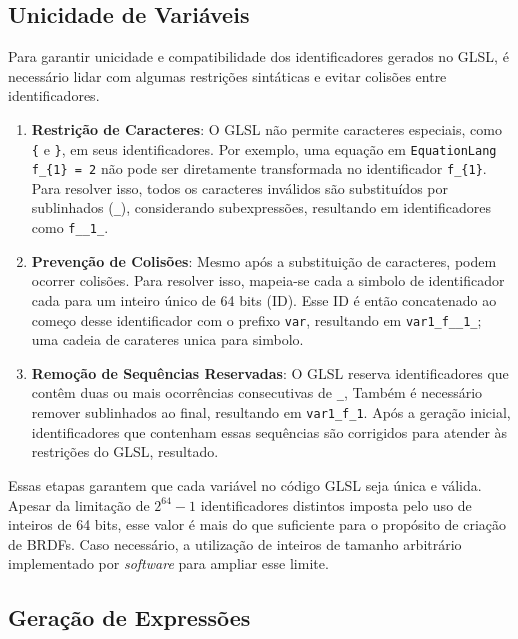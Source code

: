 \subsection{Unicidade de Variáveis} \label{sec-unicidade}

Para garantir unicidade e compatibilidade dos identificadores gerados no GLSL, é necessário lidar com algumas restrições sintáticas e evitar colisões entre identificadores.

\begin{enumerate}
    \item \textbf{Restrição de Caracteres}: O GLSL não permite caracteres especiais, como \verb"{" e \verb"}", em seus identificadores. Por exemplo, uma equação em \texttt{EquationLang} \verb "f_{1} = 2" não pode ser diretamente transformada no identificador \verb`f_{1}`. Para resolver isso, todos os caracteres inválidos são substituídos por sublinhados (\verb`_`), considerando subexpressões, resultando em identificadores como \verb`f__1_`.

    \item \textbf{Prevenção de Colisões}: Mesmo após a substituição de caracteres, podem ocorrer colisões. Para resolver isso, mapeia-se cada a simbolo de identificador cada para um inteiro único de 64 bits (ID). Esse ID é então concatenado ao começo desse identificador com o prefixo \verb`var`, resultando em \verb`var1_f__1_`; uma cadeia de carateres unica para simbolo.

    \item \textbf{Remoção de Sequências Reservadas}: O GLSL reserva identificadores que contêm duas ou mais ocorrências consecutivas de \verb`_`, Também é necessário remover sublinhados ao final, resultando em \verb`var1_f_1`. Após a geração inicial, identificadores que contenham essas sequências são corrigidos para atender às restrições do GLSL, resultado.
\end{enumerate}


Essas etapas garantem que cada variável no código GLSL seja única e válida. Apesar da limitação de $2^{64} - 1$ identificadores distintos imposta pelo uso de inteiros de 64 bits, esse valor é mais do que suficiente para o propósito de criação de BRDFs. Caso necessário, a utilização de inteiros de tamanho arbitrário implementado por \textit{software} para ampliar esse limite.



\subsection{Geração de Expressões} \label{sec-RHS}

